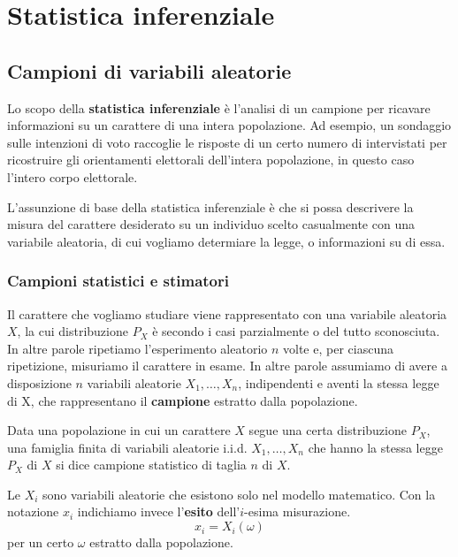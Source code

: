 \part{Statistica inferenziale}

\chapter{Campioni di variabili aleatorie}
Lo scopo della \textbf{statistica inferenziale} è l'analisi di un campione per ricavare
informazioni su un carattere di una intera popolazione. Ad esempio, un sondaggio sulle intenzioni
di voto raccoglie le risposte di un certo numero di intervistati per ricostruire gli orientamenti
elettorali dell'intera popolazione, in questo caso l'intero corpo elettorale.

L'assunzione di base della statistica inferenziale è che si possa descrivere la misura del carattere
desiderato su un individuo scelto casualmente con una variabile aleatoria, di cui vogliamo
determiare la legge, o informazioni su di essa.

\section{Campioni statistici e stimatori}
Il carattere che vogliamo studiare viene rappresentato con una variabile aleatoria
$X$, la cui distribuzione $P_X$ è secondo i casi parzialmente o del tutto sconosciuta. In altre
parole ripetiamo l'esperimento aleatorio $n$ volte e, per ciascuna ripetizione, misuriamo il
carattere in esame. In altre parole assumiamo di avere a disposizione $n$ variabili aleatorie
$X_1, \dots, X_n$, indipendenti e aventi la stessa legge di X, che rappresentano il
\textbf{campione} estratto dalla popolazione.

\begin{definition}\label{def: campione statistico}
	Data una popolazione in cui un carattere $X$ segue una certa distribuzione $P_X$, una famiglia
	finita di variabili aleatorie i.i.d. $X_1, \dots, X_n$ che hanno la stessa legge $P_X$ di $X$
	si dice campione statistico di taglia $n$ di $X$.
\end{definition}

\begin{observation}
	Le $X_i$ sono variabili aleatorie che esistono solo nel modello matematico. Con la notazione
	$x_i$ indichiamo invece l'\textbf{esito} dell'$i$-esima misurazione.
	\[ x_i = X_i(\omega) \]
	per un certo $\omega$ estratto dalla popolazione.
\end{observation}

